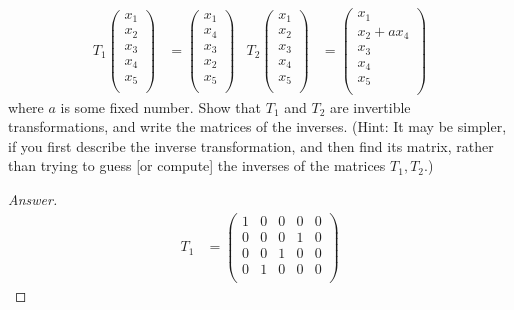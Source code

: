 \documentclass[../psets.tex]{subfiles}
\begin{document}
\begin{enumerate}[label={\textbf{6.\arabic*.}}]
    \begin{align*}
        T_1
        \begin{pmatrix}
            x_1\\
            x_2\\
            x_3\\
            x_4\\
            x_5\\
        \end{pmatrix}
        &=
        \begin{pmatrix}
            x_1\\
            x_4\\
            x_3\\
            x_2\\
            x_5\\
        \end{pmatrix}&
        T_2
        \begin{pmatrix}
            x_1\\
            x_2\\
            x_3\\
            x_4\\
            x_5\\
        \end{pmatrix}
        &=
        \begin{pmatrix}
            x_1\\
            x_2+ax_4\\
            x_3\\
            x_4\\
            x_5\\
        \end{pmatrix}
    \end{align*}
    where $a$ is some fixed number. Show that $T_1$ and $T_2$ are invertible transformations, and write the matrices of the inverses. (Hint: It may be simpler, if you first describe the inverse transformation, and then find its matrix, rather than trying to guess [or compute] the inverses of the matrices $T_1,T_2$.)
    \begin{proof}[Answer]
        \begin{align*}
            T_1 &=
            \begin{pmatrix}
                1 & 0 & 0 & 0 & 0\\
                0 & 0 & 0 & 1 & 0\\
                0 & 0 & 1 & 0 & 0\\
                0 & 1 & 0 & 0 & 0\\

\end{pmatrix}
\end{align*}
\end{proof}
\end{enumerate}
\end{document}
